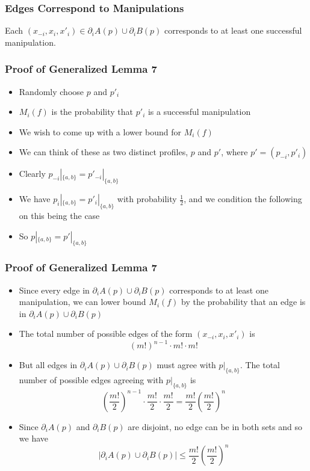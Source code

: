 \documentclass[aspectratio=169]{beamer}
\begin{document}
		\begin{frame}
			\frametitle{Edges Correspond to Manipulations}

			\begin{lemma}
				Each $(x_{-i}, x_i, x'_i) \in \partial_i A(p) \cup \partial_i B(p)$ corresponds to at least one successful manipulation.
			\end{lemma}

		\end{frame}

		\begin{frame}
			\frametitle{Proof of Generalized Lemma 7}

			\begin{itemize}
				\item Randomly choose $p$ and $p'_i$
				\item $M_i(f)$ is the probability that $p'_i$ is a successful manipulation
				\item We wish to come up with a lower bound for $M_i(f)$
				\item We can think of these as two distinct profiles, $p$ and $p'$, where $p' = (p_{-i}, p'_i)$
				\item Clearly $p_{-i}|_{\{a,b\}} = p'_{-i}|_{\{a,b\}}$
				\item We have $p_i|_{\{a,b\}} = p'_i|_{\{a,b\}}$ with probability $\frac{1}{2}$, and we condition the following on this being the case
				\item So $p|_{\{a,b\}} = p'|_{\{a,b\}}$
			\end{itemize}
		\end{frame}

		\begin{frame}
			\frametitle{Proof of Generalized Lemma 7}

			\begin{itemize}
				\item Since every edge in $\partial_i A(p) \cup \partial_i B(p)$ corresponds to at least one manipulation, we can lower bound $M_i(f)$ by the probability that an edge is in $\partial_i A(p) \cup \partial_i B(p)$
				\item The total number of possible edges of the form $(x_{-i}, x_i, x'_i)$ is
					\[
						(m!)^{n-1} \cdot m! \cdot m!
					\]
				\item But all edges in $\partial_i A(p) \cup \partial_i B(p)$ must agree with $p|_{\{a, b\}}$. The total number of possible edges agreeing with $p|_{\{a, b\}}$ is
					\[
						\left(\frac{m!}{2}\right)^{n-1} \cdot \frac{m!}{2} \cdot \frac{m!}{2} = \frac{m!}{2}\left(\frac{m!}{2}\right)^{n}
					\]
				\item Since $\partial_i A(p)$ and $\partial_i B(p)$ are disjoint, no edge can be in both sets and so we have
					\[
						|\partial_i A(p) \cup \partial_i B(p)| \le \frac{m!}{2}\left(\frac{m!}{2}\right)^{n}
					\]
			\end{itemize}
		\end{frame}
\end{document}
